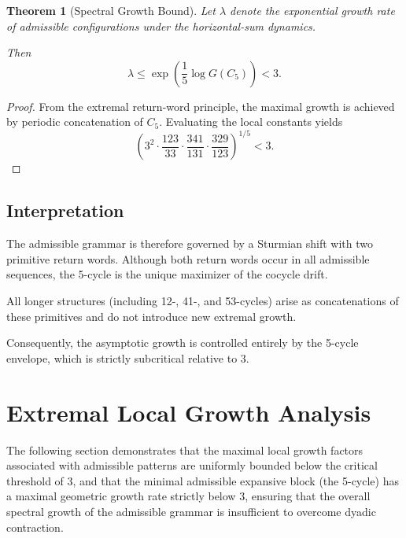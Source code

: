 \documentclass[12pt, oneside]{article}
\numberwithin{equation}{section}
\theoremstyle{definition}
\theoremstyle{plain}
\newtheorem{theorem}{Theorem}[section]
\theoremstyle{remark}
\begin{document}
\begin{theorem}[Spectral Growth Bound]
Let $\lambda$ denote the exponential growth rate of admissible configurations
under the horizontal-sum dynamics.

Then
\[
\lambda
\le
\exp\!\left(\frac{1}{5}\log G(C_5)\right)
< 3.
\]
\end{theorem}

\begin{proof}
From the extremal return-word principle, the maximal growth is achieved by
periodic concatenation of $C_5$. Evaluating the local constants yields
\[
\left(
3^{2}
\cdot \frac{123}{33}
\cdot \frac{341}{131}
\cdot \frac{329}{123}
\right)^{1/5}
< 3.
\]
\end{proof}


\subsection{Interpretation}

The admissible grammar is therefore governed by a Sturmian shift with two
primitive return words. Although both return words occur in all admissible
sequences, the 5-cycle is the unique maximizer of the cocycle drift.

All longer structures (including 12-, 41-, and 53-cycles) arise as
concatenations of these primitives and do not introduce new extremal growth.

Consequently, the asymptotic growth is controlled entirely by the
5-cycle envelope, which is strictly subcritical relative to $3$.

\section{Extremal Local Growth Analysis}

The following section demonstrates that the maximal local growth factors
associated with admissible patterns are uniformly bounded below the critical
threshold of 3, and that the minimal admissible expansive block (the 5-cycle)
has a maximal geometric growth rate strictly below 3, ensuring that the overall
spectral growth of the admissible grammar is insufficient to overcome dyadic
contraction.
\end{document}
